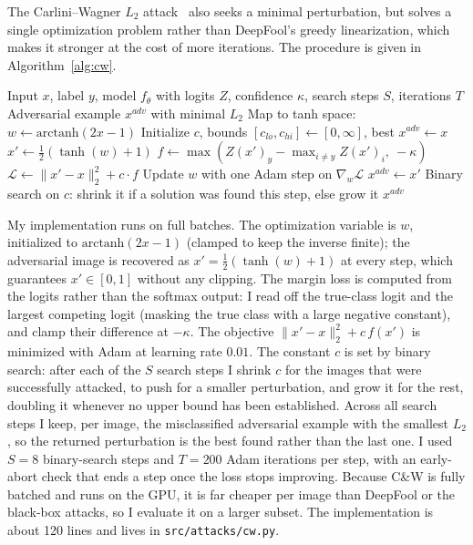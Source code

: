 The Carlini--Wagner $L_2$ attack~\cite{carlini2017towards} also seeks a minimal perturbation, but solves a single optimization problem rather than DeepFool's greedy linearization, which makes it stronger at the cost of more iterations. The procedure is given in Algorithm~\ref{alg:cw}.

\begin{algorithm}[htbp]
\caption{Carlini--Wagner $L_2$ Attack}
\label{alg:cw}
\begin{algorithmic}[1]
\REQUIRE Input $x$, label $y$, model $f_\theta$ with logits $Z$, confidence $\kappa$, search steps $S$, iterations $T$
\ENSURE Adversarial example $x^{adv}$ with minimal $L_2$
\STATE Map to tanh space: $w \gets \text{arctanh}(2x - 1)$
\STATE Initialize $c$, bounds $[c_{lo}, c_{hi}] \gets [0, \infty]$, best $x^{adv} \gets x$
        \STATE $x' \gets \tfrac{1}{2}(\tanh(w) + 1)$
        \STATE $f \gets \max\!\left(Z(x')_y - \max_{i \neq y} Z(x')_i,\ -\kappa\right)$
        \STATE $\mathcal{L} \gets \|x' - x\|_2^2 + c \cdot f$
        \STATE Update $w$ with one Adam step on $\nabla_w \mathcal{L}$
            \STATE $x^{adv} \gets x'$
        \ENDIF
    \ENDFOR
    \STATE Binary search on $c$: shrink it if a solution was found this step, else grow it
\ENDFOR
\RETURN $x^{adv}$
\end{algorithmic}
\end{algorithm}

My implementation runs on full batches. The optimization variable is $w$, initialized to $\text{arctanh}(2x - 1)$ (clamped to keep the inverse finite); the adversarial image is recovered as $x' = \tfrac{1}{2}(\tanh(w) + 1)$ at every step, which guarantees $x' \in [0, 1]$ without any clipping. The margin loss is computed from the logits rather than the softmax output: I read off the true-class logit and the largest competing logit (masking the true class with a large negative constant), and clamp their difference at $-\kappa$. The objective $\|x' - x\|_2^2 + c\,f(x')$ is minimized with Adam at learning rate $0.01$. The constant $c$ is set by binary search: after each of the $S$ search steps I shrink $c$ for the images that were successfully attacked, to push for a smaller perturbation, and grow it for the rest, doubling it whenever no upper bound has been established. Across all search steps I keep, per image, the misclassified adversarial example with the smallest $L_2$, so the returned perturbation is the best found rather than the last one. I used $S = 8$ binary-search steps and $T = 200$ Adam iterations per step, with an early-abort check that ends a step once the loss stops improving. Because C\&W is fully batched and runs on the GPU, it is far cheaper per image than DeepFool or the black-box attacks, so I evaluate it on a larger subset. The implementation is about 120 lines and lives in \texttt{src/attacks/cw.py}.


